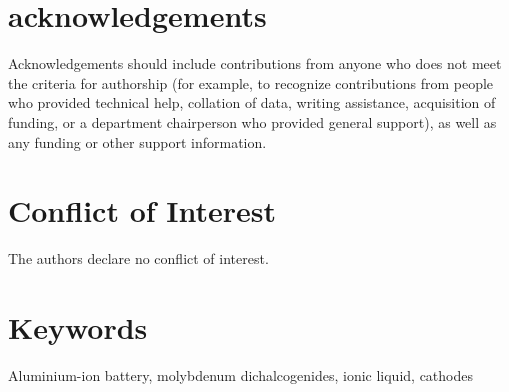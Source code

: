 \documentclass[num-refs]{wiley-article}
\begin{document}
\section*{acknowledgements}
Acknowledgements should include contributions from anyone who does not meet the criteria for authorship (for example, to recognize contributions from people who provided technical help, collation of data, writing assistance, acquisition of funding, or a department chairperson who provided general support), as well as any funding or other support information. 

\section*{Conflict of Interest}
The authors declare no conflict of interest.

\section*{Keywords}
Aluminium-ion battery, molybdenum dichalcogenides, ionic liquid, cathodes




\pagebreak

\end{document}
